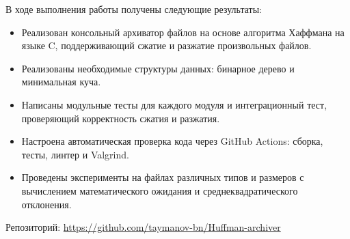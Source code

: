 \documentclass[a4paper]{article}
\begin{document}
В ходе выполнения работы получены следующие результаты:

\begin{itemize}
    \item Реализован консольный архиватор файлов на основе алгоритма Хаффмана на языке C, поддерживающий сжатие и разжатие произвольных файлов.
    \item Реализованы необходимые структуры данных: бинарное дерево и минимальная куча.
    \item Написаны модульные тесты для каждого модуля и интеграционный тест, проверяющий корректность сжатия и разжатия.
    \item Настроена автоматическая проверка кода через GitHub Actions: сборка, тесты, линтер и Valgrind.
    \item Проведены эксперименты на файлах различных типов и размеров с вычислением математического ожидания и среднеквадратического отклонения.
\end{itemize}

Репозиторий: \url{https://github.com/taymanov-bn/Huffman-archiver}
\end{document}
